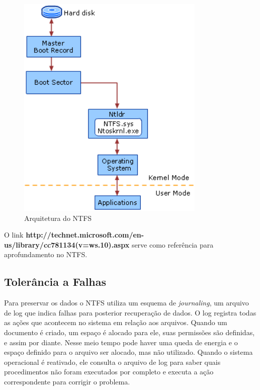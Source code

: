 \begin{figure}[htb]
	\centering
	\includegraphics[width=0.8\textwidth]{sistemas_de_arquivos/fig/ntfs.png}
	\caption{Arquitetura do NTFS}
	\label{fig:ntfs}
\end{figure}

\newpage

O link \textbf{http://technet.microsoft.com/en-us/library/cc781134(v=ws.10).aspx} serve como referência para aprofundamento no NTFS.

\subsection{Tolerância a Falhas}

Para preservar os dados o NTFS utiliza um esquema de \emph{journaling}, um arquivo de log que indica falhas para posterior recuperação de dados. O log registra todas as ações que acontecem no sistema em relação aos arquivos. Quando um documento é criado, um espaço é alocado para ele, suas permissões são definidas, e assim por diante. Nesse meio tempo pode haver uma queda de energia e o espaço definido para o arquivo ser alocado, mas não utilizado. Quando o sistema operacional é reativado, ele consulta o arquivo de log para saber quais procedimentos não foram executados por completo e executa a ação correspondente para corrigir o problema.

